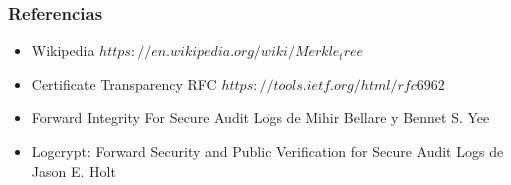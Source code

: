 \documentclass[10pt, a4paper,english,spanish]{beamer}
\begin{document}
\begin{frame}
\frametitle{Referencias}


\begin{itemize}

\item Wikipedia \(https://en.wikipedia.org/wiki/Merkle_tree\)
\item Certificate Transparency RFC \(https://tools.ietf.org/html/rfc6962\)
\item Forward Integrity For Secure Audit Logs de Mihir Bellare y Bennet S. Yee
\item Logcrypt: Forward Security and Public Verification for Secure Audit Logs de Jason E. Holt

\end{itemize}
\end{frame}
\end{document}
